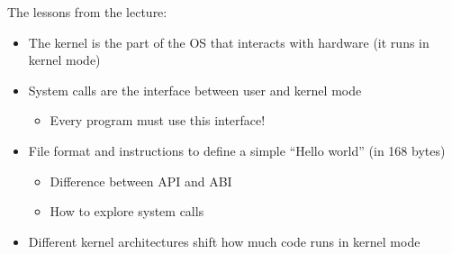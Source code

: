 \begin{slide}


  The lessons from the lecture:

  \begin{itemize}
    \item The kernel is the part of the OS that interacts with hardware \newline
          (it runs in kernel mode)
    \item System calls are the interface between user and kernel mode
      \begin{itemize}
        \item Every program must use this interface!
      \end{itemize}
    \item File format and instructions to define a simple ``Hello world''
          (in 168 bytes)
      \begin{itemize}
        \item Difference between API and ABI
        \item How to explore system calls
      \end{itemize}
    \item Different kernel architectures shift how much code runs in kernel
          mode
  \end{itemize}

\end{slide}

